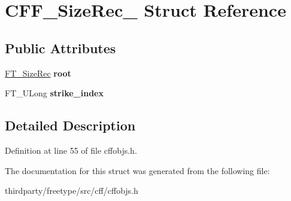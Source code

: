 \hypertarget{struct_c_f_f___size_rec__}{}\section{C\+F\+F\+\_\+\+Size\+Rec\+\_\+ Struct Reference}
\label{struct_c_f_f___size_rec__}
\subsection*{Public Attributes}
\begin{DoxyCompactItemize}
\item 
\mbox{\label{struct_c_f_f___size_rec___abb30943bad9b5c4c966b4bf23a6594a4}} 
\hyperlink{struct_f_t___size_rec__}{F\+T\+\_\+\+Size\+Rec} {\bfseries root}
\item 
\mbox{\label{struct_c_f_f___size_rec___addb560939c6d5a60749aa3e3ff782ccb}} 
F\+T\+\_\+\+U\+Long {\bfseries strike\+\_\+index}
\end{DoxyCompactItemize}


\subsection{Detailed Description}


Definition at line 55 of file cffobjs.\+h.



The documentation for this struct was generated from the following file\+:\begin{DoxyCompactItemize}
\item 
thirdparty/freetype/src/cff/cffobjs.\+h\end{DoxyCompactItemize}

